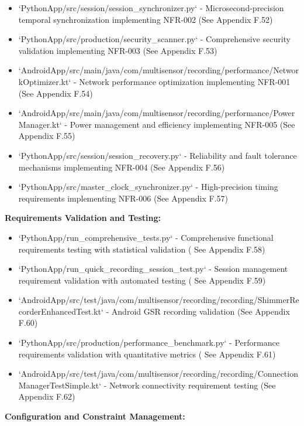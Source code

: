 \documentclass[12pt,a4paper]{article}
\begin{document}
\begin{itemize}
\item `PythonApp/src/session/session_synchronizer.py` - Microsecond-precision temporal synchronization implementing
  NFR-002 (See Appendix F.52)
\item `PythonApp/src/production/security_scanner.py` - Comprehensive security validation implementing NFR-003 (See Appendix
  F.53)
\item `AndroidApp/src/main/java/com/multisensor/recording/performance/NetworkOptimizer.kt` - Network performance
  optimization implementing NFR-001 (See Appendix F.54)
\item `AndroidApp/src/main/java/com/multisensor/recording/performance/PowerManager.kt` - Power management and efficiency
  implementing NFR-005 (See Appendix F.55)
\item `PythonApp/src/session/session_recovery.py` - Reliability and fault tolerance mechanisms implementing NFR-004 (See
  Appendix F.56)
\item `PythonApp/src/master_clock_synchronizer.py` - High-precision timing requirements implementing NFR-006 (See Appendix
  F.57)

\end{itemize}
\textbf{Requirements Validation and Testing:}

\begin{itemize}
\item `PythonApp/run_comprehensive_tests.py` - Comprehensive functional requirements testing with statistical validation (
  See Appendix F.58)
\item `PythonApp/run_quick_recording_session_test.py` - Session management requirement validation with automated testing (
  See Appendix F.59)
\item `AndroidApp/src/test/java/com/multisensor/recording/recording/ShimmerRecorderEnhancedTest.kt` - Android GSR recording
  validation (See Appendix F.60)
\item `PythonApp/src/production/performance_benchmark.py` - Performance requirements validation with quantitative metrics (
  See Appendix F.61)
\item `AndroidApp/src/test/java/com/multisensor/recording/recording/ConnectionManagerTestSimple.kt` - Network connectivity
  requirement testing (See Appendix F.62)

\end{itemize}
\textbf{Configuration and Constraint Management:}
\end{document}
